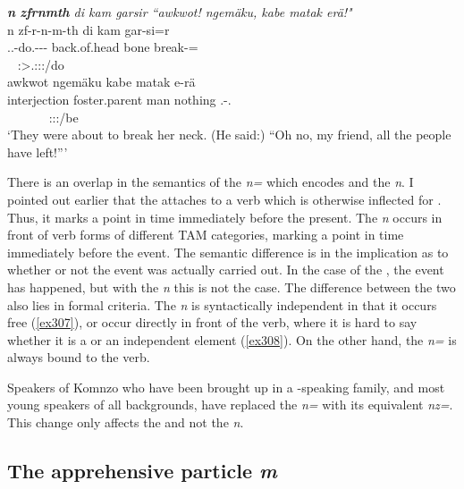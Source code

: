 \begin{exe}
	\ex \emph{\textbf{n} \textbf{zfrnmth} di kam garsir ``awkwot! ngemäku, kabe matak erä!"}\\
	\glll n zf-r-n-m-th di kam gar-si=r\\
	{\Imn} \Tsg.\F.\Betatwo-do.\Ext-\Du-\Dur-\Stnsg{} back.of.head bone break-\Nmlz={\Purp}\\
	~ {\footnotesize \Stdu:\Sbj>\Tsg.\F:\Obj:\Pst:\Dur/do} ~ ~ ~\\
	\sn
	\glll awkwot ngemäku kabe matak e-rä\\
	interjection foster.parent man nothing \Stnsg.\Alph-\Cop.\Ndu\\
	~ ~ ~ ~ {\footnotesize \Stpl:\Sbj:\Nonpast:\Ipfv/be}\\
	\trans `They were about to break her neck. (He said:) ``Oh no, my friend, all the people have left!''' 
	\label{ex308}
\end{exe}

There is an overlap in the semantics of the  \emph{n=} which encodes  and the   \emph{n}. I pointed out earlier that the   attaches to a verb which is otherwise inflected for . Thus, it marks a point in time immediately before the present. The  \emph{n} occurs in front of verb forms of different TAM categories, marking a point in time immediately before the event. The semantic difference is in the implication as to whether or not the event was actually carried out. In the case of the  , the event has happened, but with the  \emph{n} this is not the case. The difference between the two also lies in formal criteria. The  \emph{n} is syntactically independent in that it occurs free (\ref{ex307}), or occur directly in front of the verb, where it is hard to say whether it is a  or an independent element (\ref{ex308}). On the other hand, the   \emph{n=} is always bound to the verb.

Speakers of Komnzo who have been brought up in a -speaking family, and most young speakers of all backgrounds, have replaced the   \emph{n=} with its  equivalent \emph{nz=}. This change only affects the  and not the   \emph{n}.

\subsection{The apprehensive particle \emph{m}}\label{apprehensivem}

